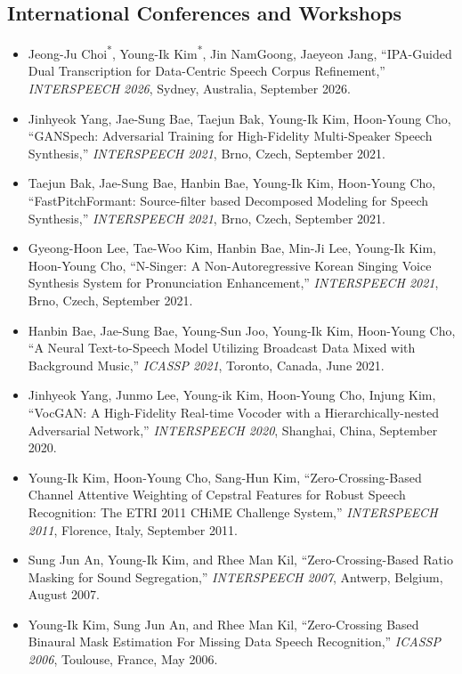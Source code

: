 \documentclass[11pt,a4paper]{article}
\begin{document}
\subsection*{International Conferences and Workshops}
\begin{itemize}[leftmargin=*]
\item Jeong-Ju Choi\textsuperscript{*}, Young-Ik Kim\textsuperscript{*}, Jin NamGoong, Jaeyeon Jang, ``IPA-Guided Dual Transcription for Data-Centric Speech Corpus Refinement,'' \textit{INTERSPEECH 2026}, Sydney, Australia, September 2026.
\item Jinhyeok Yang, Jae-Sung Bae, Taejun Bak, Young-Ik Kim, Hoon-Young Cho, ``GANSpech: Adversarial Training for High-Fidelity Multi-Speaker Speech Synthesis,'' \textit{INTERSPEECH 2021}, Brno, Czech, September 2021.
\item Taejun Bak, Jae-Sung Bae, Hanbin Bae, Young-Ik Kim, Hoon-Young Cho, ``FastPitchFormant: Source-filter based Decomposed Modeling for Speech Synthesis,'' \textit{INTERSPEECH 2021}, Brno, Czech, September 2021.
\item Gyeong-Hoon Lee, Tae-Woo Kim, Hanbin Bae, Min-Ji Lee, Young-Ik Kim, Hoon-Young Cho, ``N-Singer: A Non-Autoregressive Korean Singing Voice Synthesis System for Pronunciation Enhancement,'' \textit{INTERSPEECH 2021}, Brno, Czech, September 2021.
\item Hanbin Bae, Jae-Sung Bae, Young-Sun Joo, Young-Ik Kim, Hoon-Young Cho, ``A Neural Text-to-Speech Model Utilizing Broadcast Data Mixed with Background Music,'' \textit{ICASSP 2021}, Toronto, Canada, June 2021.
\item Jinhyeok Yang, Junmo Lee, Young-ik Kim, Hoon-Young Cho, Injung Kim, ``VocGAN: A High-Fidelity Real-time Vocoder with a Hierarchically-nested Adversarial Network,'' \textit{INTERSPEECH 2020}, Shanghai, China, September 2020.
\item Young-Ik Kim, Hoon-Young Cho, Sang-Hun Kim, ``Zero-Crossing-Based Channel Attentive Weighting of Cepstral Features for Robust Speech Recognition: The ETRI 2011 CHiME Challenge System,'' \textit{INTERSPEECH 2011}, Florence, Italy, September 2011.
\item Sung Jun An, Young-Ik Kim, and Rhee Man Kil, ``Zero-Crossing-Based Ratio Masking for Sound Segregation,'' \textit{INTERSPEECH 2007}, Antwerp, Belgium, August 2007. 
\item Young-Ik Kim, Sung Jun An, and Rhee Man Kil, ``Zero-Crossing Based Binaural Mask Estimation For Missing Data Speech Recognition,'' \textit{ICASSP 2006}, Toulouse, France, May 2006. 

\end{itemize}
\end{document}
